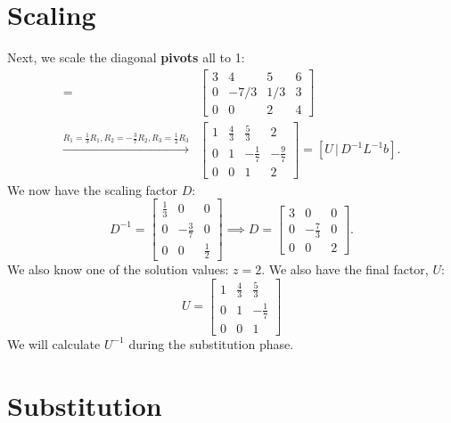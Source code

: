 \documentclass[10pt]{article}
\begin{document}
\section{Scaling}

Next, we scale the diagonal \textbf{pivots} all to 1: 
\begin{align*} 
[DU \, | \, L^{-1} b]  = & \left[ \begin{array}{ccc|ccc|c}
3 & 4 & 5 &  6 \\
0 & -7/3 & 1/3 & 3\\ 
0 & 0 & 2 & 4
\end{array}\right] \\
\xrightarrow{R_1 = \frac{1}{3} R_1, R_2 = -\frac{3}{7} R_2, R_3 = \frac{1}{2} R_3} 
& \left[ \begin{array}{ccc|ccc|c}
1 & \frac{4}{3} & \frac{5}{3}  & 2 \\
0 & 1 & -\frac{1}{7}  &  -\frac{9}{7} \\ 
0 & 0 & 1 & 2
\end{array}\right] = [U \, | \, D^{-1} L^{-1} b]. 
\end{align*}
We now have the scaling factor $D$: 
\[ D^{-1} = \left[ \begin{array}{ccc}
\frac{1}{3} & 0 & 0 \\ 0 & -\frac{3}{7} & 0 \\ 0 & 0 & \frac{1}{2}
\end{array}\right] \implies D = \left[ \begin{array}{ccc}
3 & 0 & 0 \\ 0 & -\frac{7}{3} & 0 \\ 0 & 0 & 2
\end{array}\right]. \]
We also know one of the solution values: $z = 2$. 
We also have the final factor, $U$: 
\[ U = \left[ \begin{array}{ccc}
1 & \frac{4}{3} & \frac{5}{3}  \\
0 & 1 & -\frac{1}{7}  \\ 
0 & 0 & 1 
\end{array}\right] \]
We will calculate $U^{-1}$ during the substitution phase. 

\section{Substitution}
\end{document}
